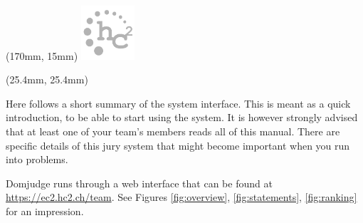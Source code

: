 \begin{textblock*}{20mm}(170mm, 15mm)
\includegraphics[width=20mm]{hc2logogray.pdf}
\end{textblock*}

\begin{textblock*}{50mm}(25.4mm, 25.4mm)
\noindent \textcolor{gray}{\langinfo \\ \textbf{\taskinfo} }
\end{textblock*}


\newcommand{\heveaonly}[1]{#1}
\renewcommand{\heveaonly}[1]{}

\noindent Here follows a short summary of the system interface. This is meant as a
quick introduction, to be able to start using the system. It is
however strongly advised that at least one of your
team's members reads all of this manual. There are
specific details of this jury system that might become important when
you run into problems.

Domjudge runs through a web interface that can be found at
\url{https://ec2.hc2.ch/team}.
See Figures \ref{fig:overview}, \ref{fig:statements}, \ref{fig:ranking}
for an impression.

